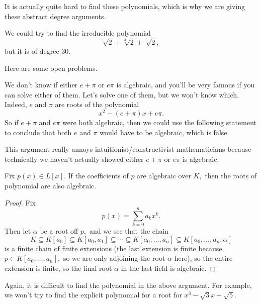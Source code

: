 \documentclass[../notes.tex]{subfiles}
\begin{document}
It is actually quite hard to find these polynomials, which is why we are giving these abstract degree arguments.
\begin{example}
	We could try to find the irreducible polynomial
	\[\sqrt2+\sqrt[3]2+\sqrt[5]2,\]
	but it is of degree $30.$
\end{example}
Here are some open problems.
\begin{example}
	We don't know if either $e+\pi$ or $e\pi$ is algebraic, and you'll be very famous if you can solve either of them. Let's solve one of them, but we won't know which. Indeed, $e$ and $\pi$ are roots of the polynomial
	\[x^2-(e+\pi)x+e\pi.\]
	So if $e+\pi$ and $e\pi$ were both algebraic, then we could use the following statement to conclude that both $e$ and $\pi$ would have to be algebraic, which is false.
\end{example}
\begin{remark}
	This argument really annoys intuitionist/constructivist mathematicians because technically we haven't actually showed either $e+\pi$ or $e\pi$ is algebraic.
\end{remark}
\begin{proposition}
	Fix $p(x)\in L[x].$ If the coefficients of $p$ are algebraic over $K,$ then the roots of polynomial are also algebraic.
\end{proposition}
\begin{proof}
	Fix
	\[p(x)=\sum_{k=0}^na_kx^k.\]
	Then let $\alpha$ be a root off $p,$ and we see that the chain
	\[K\subseteq K[a_0]\subseteq K[a_0,a_1]\subseteq\cdots\subseteq K[a_0,\ldots,a_n]\subseteq K[a_0,\ldots,a_n,\alpha]\]
	is a finite chain of finite extensions (the last extension is finite because $p\in K[a_0,\ldots,a_n],$ so we are only adjoining the root $\alpha$ here), so the entire extension is finite, so the final root $\alpha$ in the last field is algebraic.
\end{proof}
\begin{remark}
	Again, it is difficult to find the polynomial in the above argument. For example, we won't try to find the explicit polynomial for a root for $x^3-\sqrt3 x+\sqrt 5.$
\end{remark}
\end{document}
